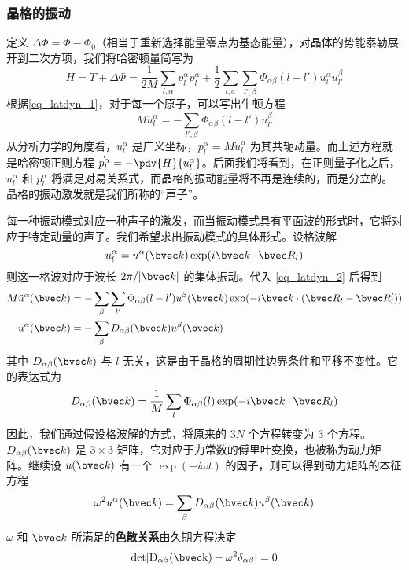 \subsubsection{晶格的振动}
定义 $\Delta \Phi=\Phi-\Phi_0$（相当于重新选择能量零点为基态能量），对晶体的势能泰勒展开到二次方项，我们将哈密顿量简写为
\begin{equation}
H=T+\Delta \Phi=\frac{1}{2M}\sum_{l,\alpha}p_l^\alpha p_l^\alpha + \frac{1}{2}\sum_{l,a}\sum_{l',\beta}\Phi_{\alpha\beta}(l-l')u_l^\alpha u_{l'}^\beta
\end{equation}
根据\autoref{eq_latdyn_1}，对于每一个原子，可以写出牛顿方程
\begin{equation}\label{eq_latdyn_2}
M \ddot{u}_l^\alpha = -\sum_{l',\beta}\Phi_{\alpha\beta}(l-l')u_{l'}^\beta
\end{equation}
从分析力学的角度看，$u_l^\alpha$ 是广义坐标，$p_l^\alpha=M\dot{u}_l^\alpha$ 为其共轭动量。而上述方程就是哈密顿正则方程 $\dot{p_l^\alpha}=-\pdv{H}{u_l^\alpha}$。后面我们将看到，在正则量子化之后，$u_l^\alpha$ 和 $p_l^\alpha$ 将满足对易关系式，而晶格的振动能量将不再是连续的，而是分立的。晶格的振动激发就是我们所称的“声子”。

每一种振动模式对应一种声子的激发，而当振动模式具有平面波的形式时，它将对应于特定动量的声子。我们希望求出振动模式的具体形式。设格波解
\begin{equation}
u_l^\alpha = u^\alpha(\bvec k) \exp(i\bvec k\cdot \bvec R_l)
\end{equation}
则这一格波对应于波长 $2\pi/|\bvec k|$ 的集体振动。代入 \autoref{eq_latdyn_2} 后得到
\begin{equation}
\begin{aligned}
M\ddot{u}^\alpha(\bvec k)&=-\sum_{\beta}\sum_{l'}\Phi_{\alpha\beta}(l-l')u^\beta(\bvec k)\exp(-i\bvec k\cdot(\bvec R_l-\bvec R_l'))\\
\ddot{u}^\alpha(\bvec k)&=-\sum_{\beta}D_{\alpha\beta}(\bvec k)u^\beta(\bvec k)
\end{aligned}
\end{equation}
其中 $D_{\alpha\beta}(\bvec k)$ 与 $l$ 无关，这是由于晶格的周期性边界条件和平移不变性。它的表达式为
\begin{equation}
D_{\alpha\beta}(\bvec k)=\frac{1}{M}\sum_l \Phi_{\alpha\beta}(l)\exp(-i\bvec k\cdot \bvec R_l)
\end{equation}
因此，我们通过假设格波解的方式，将原来的 $3N$ 个方程转变为 $3$ 个方程。$D_{\alpha\beta}(\bvec k)$ 是 $3\times 3$ 矩阵，它对应于力常数的傅里叶变换，也被称为动力矩阵。继续设 $u(\bvec k)$ 有一个 $\exp(-i\omega t)$ 的因子，则可以得到动力矩阵的本征方程
\begin{equation}
\omega^2 u^\alpha(\bvec k)=\sum_{\beta}D_{\alpha\beta}(\bvec k)u^\beta(\bvec k)
\end{equation}
$\omega$ 和 $\bvec k$ 所满足的\textbf{色散关系}由久期方程决定
\begin{equation}
\rm{det} |D_{\alpha\beta}(\bvec k)-\omega^2\delta_{\alpha\beta}|=0
\end{equation}

